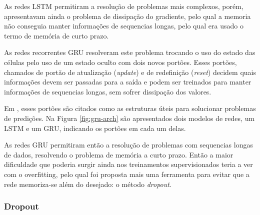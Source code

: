     As redes LSTM permitiram a resolução de problemas mais complexos, porém, apresentavam ainda o problema de dissipação do gradiente, pelo qual a memoria não conseguia manter informações de sequencias longas, pelo qual era usado o termo de memória de curto prazo.
    
    As redes recorrentes GRU resolveram este problema trocando o uso do estado das células pelo uso de um estado oculto com dois novos portões. Esses portões, chamados de portão de atualização (\textit{update}) e de redefinição (\textit{reset}) decidem quais informações devem ser passadas para a saída e  podem ser treinados para manter informações de sequencias longas, sem sofrer dissipação dos valores. 
    
    Em \cite{DLB}, esses portões são citados como as estruturas úteis para solucionar problemas de predições. Na Figura \ref{fig:gru-arch} são apresentados dois modelos de redes, um  LSTM e um GRU, indicando os portões em cada um delas. 
         	
    \begin{figure}[ht]
    \end{figure}
    
    As redes GRU permitiram então a resolução de problemas com sequencias longas de dados, resolvendo o problema de memória a curto prazo. Então a maior dificuldade que poderia surgir ainda nos treinamentos supervisionados teria a ver com o overfitting, pelo qual foi proposta mais uma ferramenta para evitar que a rede memoriza-se além do desejado: o método \textit{dropout}.
    
    \subsubsection{Dropout} \label{sec:drop_fund}
    
